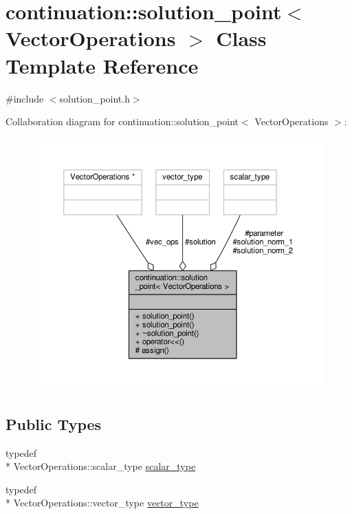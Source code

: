 \hypertarget{classcontinuation_1_1solution__point}{\section{continuation\-:\-:solution\-\_\-point$<$ Vector\-Operations $>$ Class Template Reference}
\label{classcontinuation_1_1solution__point}
}


{\ttfamily \#include $<$solution\-\_\-point.\-h$>$}



Collaboration diagram for continuation\-:\-:solution\-\_\-point$<$ Vector\-Operations $>$\-:
\nopagebreak
\begin{figure}[H]
\begin{center}
\leavevmode
\includegraphics[width=350pt]{classcontinuation_1_1solution__point__coll__graph}
\end{center}
\end{figure}
\subsection*{Public Types}
\begin{DoxyCompactItemize}
\item 
typedef \\*
Vector\-Operations\-::scalar\-\_\-type \hyperlink{classcontinuation_1_1solution__point_aa3e601aeccb1c0fd6faebd835f1e92db}{scalar\-\_\-type}
\item 
typedef \\*
Vector\-Operations\-::vector\-\_\-type \hyperlink{classcontinuation_1_1solution__point_a6c3692e61ce44b2ac89223c0f6db2895}{vector\-\_\-type}
\end{DoxyCompactItemize}
